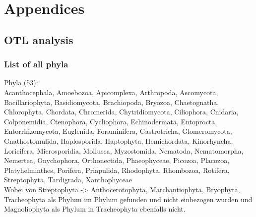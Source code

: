   


\chapter{Appendices}
  \section{OTL analysis}\label{sec:otl analysis}

    \subsection{List of all phyla}\label{subsec:listPhyla}

    Phyla (53): \\
    Acanthocephala, Amoebozoa, Apicomplexa, Arthropoda, Ascomycota, Bacillariophyta, Basidiomycota, 
      Brachiopoda, Bryozoa, Chaetognatha, Chlorophyta, Chordata, Chromerida, Chytridiomycota, 
      Ciliophora, Cnidaria, Colponemidia, Ctenophora, Cycliophora, Echinodermata, Entoprocta, 
      Entorrhizomycota, Euglenida, Foraminifera, Gastrotricha, Glomeromycota, Gnathostomulida, 
      Haplosporida, Haptophyta, Hemichordata, Kinorhyncha, Loricifera, Microsporidia, Mollusca, 
      Myzostomida, Nematoda, Nematomorpha, Nemertea, Onychophora, Orthonectida, Phaeophyceae, 
      Picozoa, Placozoa, Platyhelminthes, Porifera, Priapulida, Rhodophyta, Rhombozoa, Rotifera, 
      Streptophyta, Tardigrada, Xanthophyceae \\
    Wobei von Streptophyta -> Anthocerotophyta, Marchantiophyta, Bryophyta, Tracheophyta als
      Phylum im Phylum gefunden und nicht einbezogen wurden und Magnoliophyta als Phylum in 
      Tracheophyta ebenfalls nicht. \\

